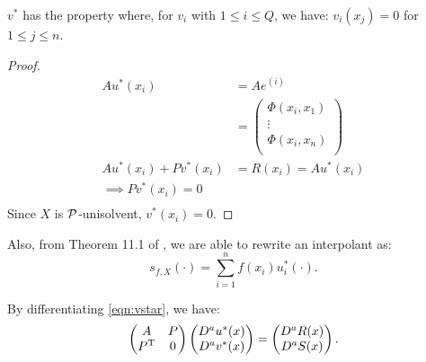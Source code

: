 \documentclass[twoside]{memoir}
\begin{document}
\begin{lem}
	$v^*$ has the property where, for $v_i$ with $1 \leq i \leq Q$, we have: $v_i(x_j) = 0$ for $1 \leq j \leq n$.
\end{lem}
\begin{proof}
	\begin{equation*}
	\begin{split}
	A u^*(x_i) &= A e^{(i)} \\
	&= \begin{pmatrix}
	\Phi(x_i, x_1) \\  \vdots \\ \Phi(x_i, x_n)\\
	\end{pmatrix} \\
	A u^*(x_i) + P v^*(x_i) &= R(x_i) = A u^*(x_i) \\
	\implies P v^*(x_i) = 0 \\
	\end{split}
	\end{equation*}
	Since $X$ is $\mathcal{P}$-unisolvent, $v^*(x_i) = 0$.
\end{proof}
Also, from Theorem 11.1 of \cite{ScatteredDataApproximation}, we are able to rewrite an interpolant as:
\begin{equation} \label{eqn:InterDecomp}
s_{f,X}(\cdot) = \sum_{i=1}^{n} f(x_i)u_i^*(\cdot).
\end{equation}

By differentiating \ref{eqn:vstar}, we have:
\begin{equation}
\begin{pmatrix}
A & P \\
P^{\text{T}} & 0 \\
\end{pmatrix}
\begin{pmatrix}
D^a u^*(x)\\ D^a v^*(x)
\end{pmatrix}
=
\begin{pmatrix}
D^a R(x)\\ D^a S(x)
\end{pmatrix}.
\end{equation}
\end{document}
